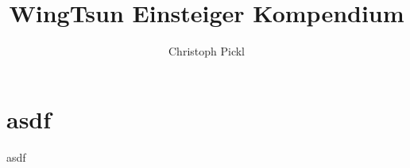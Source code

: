 \documentclass[a4paper,12pt]{scrartcl}
\title{WingTsun Einsteiger Kompendium}
\author{Christoph Pickl}
\begin{document}
\maketitle

\tableofcontents

\newpage

\section{asdf}
asdf

	
\end{document}
